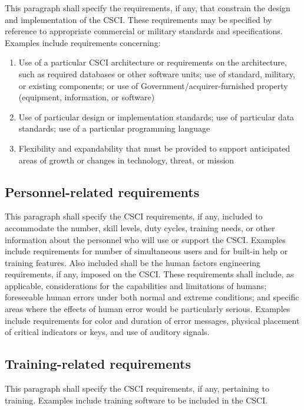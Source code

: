 This paragraph shall specify the requirements, if any, that constrain
the design and implementation of the CSCI. These requirements may be
specified by reference to appropriate commercial or military standards
and specifications. Examples include requirements concerning:

\begin{enumerate}
\itemsep1pt\parskip0pt
\item
  Use of a particular CSCI architecture or requirements on the
  architecture, such as required databases or other software units; use
  of standard, military, or existing components; or use of
  Government/acquirer-furnished property (equipment, information, or
  software)
\item
  Use of particular design or implementation standards; use of
  particular data standards; use of a particular programming language
\item
  Flexibility and expandability that must be provided to support
  anticipated areas of growth or changes in technology, threat, or
  mission
\end{enumerate}

\subsection{Personnel-related requirements}

This paragraph shall specify the CSCI requirements, if any, included to
accommodate the number, skill levels, duty cycles, training needs, or
other information about the personnel who will use or support the CSCI.
Examples include requirements for number of simultaneous users and for
built-in help or training features. Also included shall be the human
factors engineering requirements, if any, imposed on the CSCI. These
requirements shall include, as applicable, considerations for the
capabilities and limitations of humans; foreseeable human errors under
both normal and extreme conditions; and specific areas where the effects
of human error would be particularly serious. Examples include
requirements for color and duration of error messages, physical
placement of critical indicators or keys, and use of auditory signals.

\subsection{Training-related requirements}

This paragraph shall specify the CSCI requirements, if any, pertaining
to training. Examples include training software to be included in the
CSCI.

